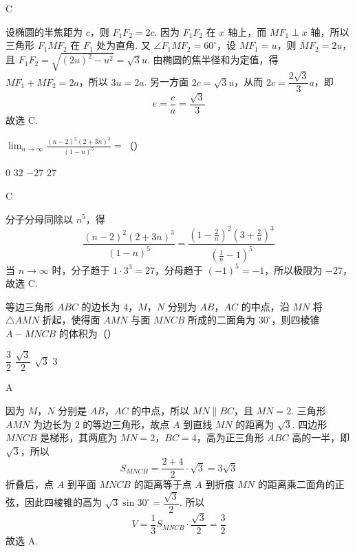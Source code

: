 \begin{answer}
C
\end{answer}

\begin{solution}
设椭圆的半焦距为 \(c\)，则 \(F_1F_2=2c\). 因为 \(F_1F_2\) 在 \(x\) 轴上，而 \(MF_1\perp x\) 轴，所以三角形 \(F_1MF_2\) 在 \(F_1\) 处为直角. 又 \(\angle F_1MF_2=60^\circ\)，设 \(MF_1=u\)，则 \(MF_2=2u\)，且
\(F_1F_2=\sqrt{(2u)^2-u^2}=\sqrt3u\).
由椭圆的焦半径和为定值，得 \(MF_1+MF_2=2a\)，所以 \(3u=2a\). 另一方面 \(2c=\sqrt3u\)，从而 \(2c=\dfrac{2\sqrt3}{3}a\)，即
\[
e=\frac ca=\frac{\sqrt3}{3}
\]
故选 C.
\end{solution}

\begin{problem}
\(\displaystyle\lim_{n\to\infty}\frac{(n-2)^2(2+3n)^3}{(1-n)^5}=\)（\quad）

\choices
    {\(0\)}
    {\(32\)}
    {\(-27\)}
    {\(27\)}
\end{problem}

\begin{answer}
C
\end{answer}

\begin{solution}
分子分母同除以 \(n^5\)，得
\[
\frac{(n-2)^2(2+3n)^3}{(1-n)^5}
=\frac{\left(1-\frac2n\right)^2\left(3+\frac2n\right)^3}{\left(\frac1n-1\right)^5}
\]
当 \(n\to\infty\) 时，分子趋于 \(1\cdot3^3=27\)，分母趋于 \((-1)^5=-1\)，所以极限为 \(-27\)，故选 C.
\end{solution}

\begin{problem}
等边三角形 \(ABC\) 的边长为 \(4\)，\(M\)，\(N\) 分别为 \(AB\)，\(AC\) 的中点，沿 \(MN\) 将 \(\triangle AMN\) 折起，使得面 \(AMN\) 与面 \(MNCB\) 所成的二面角为 \(30^\circ\)，则四棱锥 \(A-MNCB\) 的体积为（\quad）

\choices
    {\(\dfrac32\)}
    {\(\dfrac{\sqrt3}{2}\)}
    {\(\sqrt3\)}
    {\(3\)}
\end{problem}

\begin{answer}
A
\end{answer}

\begin{solution}
因为 \(M\)，\(N\) 分别是 \(AB\)，\(AC\) 的中点，所以 \(MN\parallel BC\)，且 \(MN=2\). 三角形 \(AMN\) 为边长为 \(2\) 的等边三角形，故点 \(A\) 到直线 \(MN\) 的距离为 \(\sqrt3\). 四边形 \(MNCB\) 是梯形，其两底为 \(MN=2\)，\(BC=4\)，高为正三角形 \(ABC\) 高的一半，即 \(\sqrt3\)，所以
\[
S_{MNCB}=\frac{2+4}{2}\cdot\sqrt3=3\sqrt3
\]
折叠后，点 \(A\) 到平面 \(MNCB\) 的距离等于点 \(A\) 到折痕 \(MN\) 的距离乘二面角的正弦，因此四棱锥的高为 \(\sqrt3\sin30^\circ=\dfrac{\sqrt3}{2}\). 所以
\[
V=\frac13S_{MNCB}\cdot\frac{\sqrt3}{2}=\frac32
\]
故选 A.
\end{solution}

